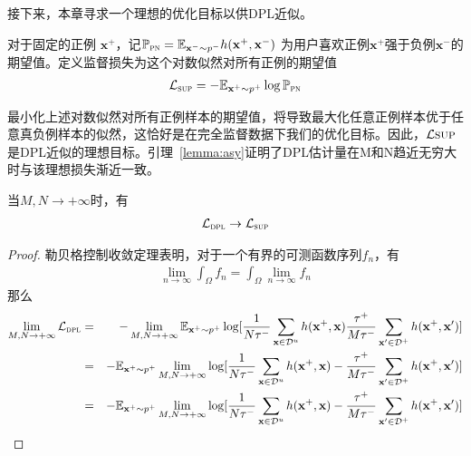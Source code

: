 接下来，本章寻求一个理想的优化目标以供DPL近似。
\begin{definition}
对于固定的正例 $\mathbf{x}^+$，记$\mathbb{P}_\textsc{pn} = \mathbb{E}_{\mathbf{x}^-\sim p^-}h(\mathbf{x}^+,\mathbf{x}^-)$ 为用户喜欢正例$\mathbf{x}^+$强于负例$\mathbf{x}^-$的期望值。定义监督损失为这个对数似然对所有正例的期望值
	\begin{eqnarray}
		\mathcal{L}_\textsc{sup} =  -\mathbb{E}_{\mathbf{x}^+\sim p^+} \log \mathbb{P}_\textsc{pn}
	\end{eqnarray}
\end{definition}
最小化上述对数似然对所有正例样本的期望值，将导致最大化任意正例样本优于任意真负例样本的似然，这恰好是在完全监督数据下我们的优化目标。因此，$\mathcal{L}\textsc{sup}$是DPL近似的理想目标。引理~\ref{lemma:asy}证明了DPL估计量在M和N趋近无穷大时与该理想损失渐近一致。
\begin{lemma}\label{lemma:asy}
当$M,N \rightarrow +\infty$时，有
	\begin{eqnarray}
		\mathcal{L}_\textsc{dpl}  \rightarrow \mathcal{L}_\textsc{sup} 
	\end{eqnarray}
	\begin{proof}
勒贝格控制收敛定理\cite{tao:shi}表明，对于一个有界的可测函数序列$f_n$，有
		\begin{eqnarray}
			\lim\limits_{n\rightarrow \infty} \int_{\Omega} f_n =\int_{\Omega} \lim\limits_{n\rightarrow\infty}f_n \nonumber
		\end{eqnarray}
那么
		\begin{eqnarray}
			\lim\limits_{\substack{M,N \rightarrow +\infty}} \mathcal{L}_\textsc{dpl} 
			&=&-\lim\limits_{\substack{M,N \rightarrow +\infty}} \mathbb{E}_{\mathbf{x}^+\sim p^+}\log [\frac{1}{N\tau^-}
			\sum_{\mathbf{x} \in \mathcal{D}^u}h(\mathbf{x}^+,\mathbf{x})  \frac{\tau^+}{M\tau^-}\sum_{\mathbf{x}^\prime\in \mathcal{D}^+}h(\mathbf{x}^+, \mathbf{x}^\prime)]\nonumber \\
			&=&-\mathbb{E}_{\mathbf{x}^+\sim p^+}\lim\limits_{\substack{M,N \rightarrow +\infty}} \log [\frac{1}{N\tau^-}
			\sum_{\mathbf{x} \in \mathcal{D}^u}h(\mathbf{x}^+,\mathbf{x}) - \frac{\tau^+}{M\tau^-}\sum_{\mathbf{x}^\prime\in \mathcal{D}^+}h(\mathbf{x}^+, \mathbf{x}^\prime)]\nonumber \\
			&=&-\mathbb{E}_{\mathbf{x}^+\sim p^+}\lim\limits_{\substack{M,N \rightarrow +\infty}} \log [\frac{1}{N\tau^-}
			\sum_{\mathbf{x} \in \mathcal{D}^u}h(\mathbf{x}^+,\mathbf{x})  - \frac{\tau^+}{M\tau^-}\sum_{\mathbf{x}^\prime\in \mathcal{D}^+}h(\mathbf{x}^+, \mathbf{x}^\prime)]\nonumber \\

\end{eqnarray}
\end{proof}
\end{lemma}
